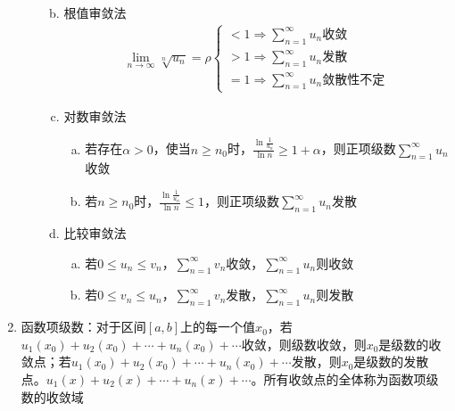 \documentclass[12pt]{book}
\begin{document}
\begin{enumerate}[1.]
\begin{enumerate}[(1)]
\begin{enumerate}[a.]
\begin{gather*}
            \end{gather*}
            \item 根值审敛法
            \begin{gather*}
                \lim_{n\rightarrow\infty}{\sqrt[n]{u_n}}=\rho \begin{cases}
                    <1 \Rightarrow \sum_{n=1}^{\infty}{u_n} \text{收敛} \\
                    >1 \Rightarrow \sum_{n=1}^{\infty}{u_n} \text{发散} \\
                    =1 \Rightarrow \sum_{n=1}^{\infty}{u_n} \text{敛散性不定} 
                \end{cases}
            \end{gather*}
            \item 对数审敛法
            \begin{enumerate}[(a)]
                \item 若存在$\alpha>0$，使当$n\geqslant n_0$时，$\frac{\ln{\frac{1}{u_n}}}{{\ln{n}}}\geqslant 1+\alpha$，则正项级数$\sum_{n=1}^{\infty}{u_n}$收敛
                \item 若$n\geqslant n_0$时，$\frac{\ln{\frac{1}{u_n}}}{{\ln{n}}}\leqslant 1$，则正项级数$\sum_{n=1}^{\infty}{u_n}$发散
            \end{enumerate}
            \item 比较审敛法
            \begin{enumerate}[(a)]
                \item 若$0\leqslant u_n \leqslant v_n$，$\sum_{n=1}^{\infty}{v_n}$收敛，$\sum_{n=1}^{\infty}{u_n}$则收敛
                \item 若$0\leqslant v_n \leqslant u_n$，$\sum_{n=1}^{\infty}{v_n}$发散，$\sum_{n=1}^{\infty}{u_n}$则发散
            \end{enumerate}
        \end{enumerate}
    \end{enumerate}
    \item 函数项级数：对于区间$[a,b]$上的每一个值$x_0$，若$u_1(x_0)+u_2(x_0)+\cdots+u_n(x_0)+\cdots$收敛，则级数收敛，则$x_0$是级数的收敛点；若$u_1(x_0)+u_2(x_0)+\cdots+u_n(x_0)+\cdots$发散，则$x_0$是级数的发散点。$u_1(x)+u_2(x)+\cdots+u_n(x)+\cdots$。所有收敛点的全体称为函数项级数的收敛域
\end{enumerate}

\end{document}
